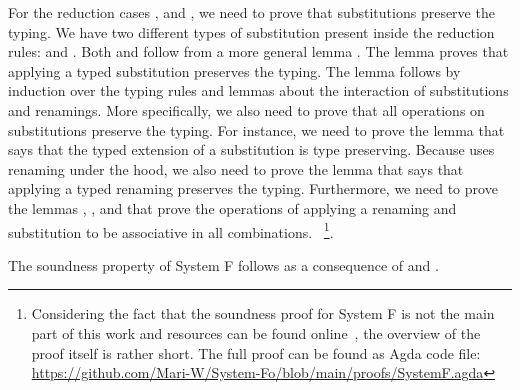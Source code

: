 \noindent For the  reduction cases ,  and , we need to prove that substitutions preserve the typing. 
We have two different types of substitution present inside the reduction rules:  \Data{[}  \Data{]} and  \Data{[}  \Data{]}.
Both  and  follow from a more general lemma . 
The lemma  proves that applying a typed substitution preserves the typing.
\newpage
\Fpreserves
The lemma  follows by induction over the typing rules and lemmas about the interaction of substitutions and renamings. 
More specifically, we also need to prove that all operations on substitutions preserve the typing. 
For instance, we need to prove the lemma  that says that the typed extension of a substitution  is type preserving. 
Because  uses renaming under the hood, we also need to prove the lemma  that says that applying a typed renaming preserves the typing. 
Furthermore, we need to prove the lemmas , ,  and  that prove the operations of applying a renaming and substitution to be associative in all combinations.
~\footnote{Considering the fact that the soundness proof for System F is not the main part of this work and resources can be found online~\cite{fp}, the overview of the proof itself is rather short.
The full proof can be found as Agda code file: \url{https://github.com/Mari-W/System-Fo/blob/main/proofs/SystemF.agda}}.

\noindent The soundness property of System F follows as a consequence of  and . 
